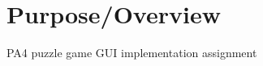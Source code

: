 \hypertarget{index_purpose}{}\section{\-Purpose/\-Overview}\label{index_purpose}
\-P\-A4 puzzle game \-G\-U\-I implementation assignment 